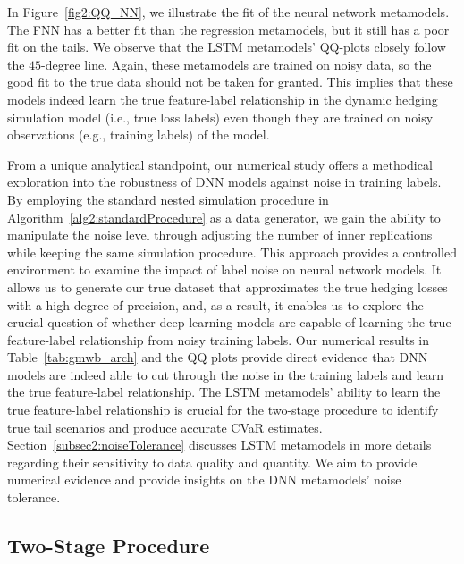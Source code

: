 In Figure~\ref{fig2:QQ_NN}, we illustrate the fit of the neural network metamodels.
The FNN has a better fit than the regression metamodels, but it still has a poor fit on the tails.
We observe that the LSTM metamodels' QQ-plots closely follow the $45$-degree line.
Again, these metamodels are trained on noisy data, so the good fit to the true data should not be taken for granted.
This implies that these models indeed learn the true feature-label relationship in the dynamic hedging simulation model (i.e., true loss labels) even though they are trained on noisy observations (e.g., training labels) of the model.

From a unique analytical standpoint, our numerical study offers a methodical exploration into the robustness of DNN models against noise in training labels. 
By employing the standard nested simulation procedure in Algorithm~\ref{alg2:standardProcedure} as a data generator, we gain the ability to manipulate the noise level through adjusting the number of inner replications while keeping the same simulation procedure.
This approach provides a controlled environment to examine the impact of label noise on neural network models.
It allows us to generate our true dataset that approximates the true hedging losses with a high degree of precision, and, as a result, it enables us to explore the crucial question of whether deep learning models are capable of learning the true feature-label relationship from noisy training labels.
Our numerical results in Table~\ref{tab:gmwb_arch} and the QQ plots provide direct evidence that DNN models are indeed able to cut through the noise in the training labels and learn the true feature-label relationship.
The LSTM metamodels' ability to learn the true feature-label relationship is crucial for the two-stage procedure to identify true tail scenarios and produce accurate CVaR estimates.
Section~\ref{subsec2:noiseTolerance} discusses LSTM metamodels in more details regarding their sensitivity to data quality and quantity.
We aim to provide numerical evidence and provide insights on the DNN metamodels' noise tolerance.

\subsection{Two-Stage Procedure} \label{subsec:twoStageProcedure}

